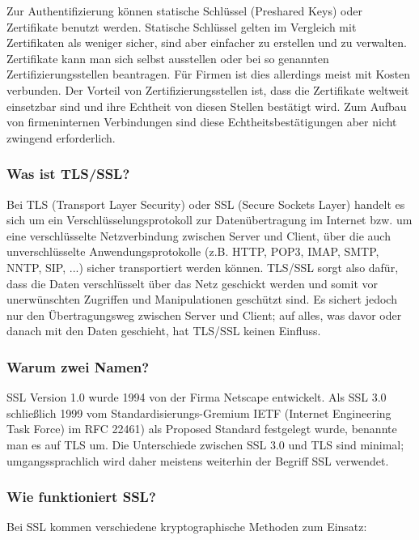\documentclass[12pt]{scrartcl}
\begin{document}
Zur Authentifizierung können statische Schlüssel (Preshared Keys) oder Zertifikate benutzt werden. Statische Schlüssel gelten im Vergleich mit Zertifikaten  als weniger sicher, sind aber einfacher zu erstellen und zu verwalten. Zertifikate kann man sich selbst ausstellen oder bei so genannten Zertifizierungsstellen beantragen. Für Firmen ist dies allerdings meist mit Kosten verbunden. Der Vorteil von Zertifizierungsstellen ist, dass die Zertifikate weltweit einsetzbar sind und ihre Echtheit von diesen Stellen bestätigt wird. Zum Aufbau von firmeninternen Verbindungen sind diese Echtheitsbestätigungen aber nicht zwingend erforderlich.

\subsubsection{Was ist TLS/SSL?}

Bei TLS (Transport Layer Security) oder SSL (Secure Sockets Layer) handelt es sich um ein Verschlüsselungsprotokoll zur Datenübertragung im Internet bzw. um eine verschlüsselte Netzverbindung zwischen Server und Client, über die auch unverschlüsselte Anwendungsprotokolle (z.B. HTTP, POP3, IMAP, SMTP, NNTP, SIP, ...) sicher transportiert werden können. TLS/SSL sorgt also dafür, dass die Daten verschlüsselt über das Netz geschickt werden und somit vor unerwünschten Zugriffen und Manipulationen geschützt sind. Es sichert jedoch nur den Übertragungsweg zwischen Server und Client; auf alles, was davor oder danach mit den Daten geschieht, hat TLS/SSL keinen Einfluss. 

\subsubsection{Warum zwei Namen?}

SSL Version 1.0 wurde 1994 von der Firma Netscape entwickelt. Als SSL 3.0 schließlich 1999 vom Standardisierungs-Gremium IETF (Internet Engineering Task Force) im RFC 22461) als Proposed Standard festgelegt wurde, benannte man es auf TLS um. Die Unterschiede zwischen SSL 3.0 und TLS sind minimal; umgangssprachlich wird daher meistens weiterhin der Begriff SSL verwendet.

\subsubsection{Wie funktioniert SSL?}

Bei SSL kommen verschiedene kryptographische Methoden zum Einsatz: 
\end{document}
